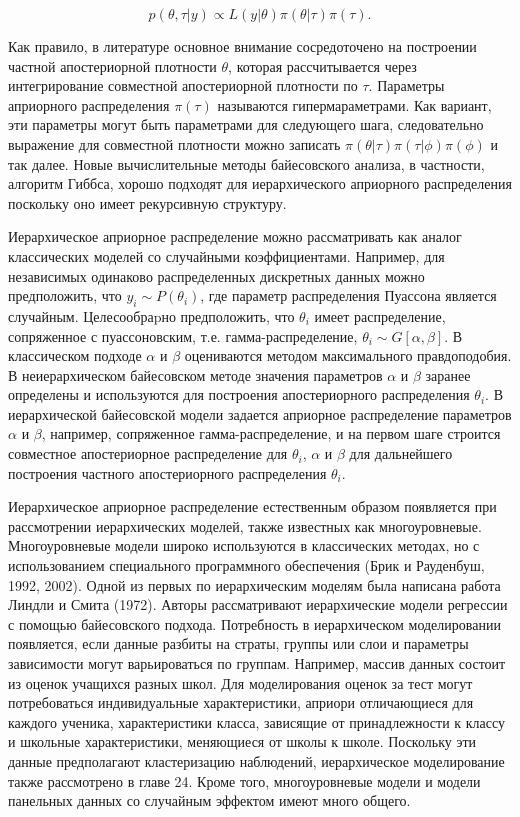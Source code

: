 \[
p(\theta,\tau|y){\propto}L(y|\theta)\pi(\theta|\tau)\pi(\tau).
\]

Как правило, в литературе основное внимание сосредоточено на построении частной апостериорной плотности $\theta$, которая рассчитывается через интегрирование совместной апостериорной плотности по $\tau$. Параметры априорного распределения $\pi(\tau)$ называются гипермараметрами. Как вариант, эти параметры могут быть параметрами для следующего шага, следовательно выражение для совместной плотности можно записать $\pi(\theta|\tau)\pi(\tau|\phi)\pi(\phi)$ и так далее. Новые вычислительные методы байесовского анализа, в частности, алгоритм Гиббса, хорошо подходят для  иерархического априорного распределения поскольку оно имеет рекурсивную структуру.

Иерархическое априорное распределение можно рассматривать как аналог классических моделей со случайными коэффициентами. Например, для независимых одинаково распределенных дискретных данных можно предположить, что $y_i{\sim}P(\theta_i)$, где параметр распределения Пуассона является случайным. Целесообраpно предположить, что $\theta_i$ имеет распределение, сопряженное с пуассоновским, т.е. гамма-распределение, $\theta_i{\sim}G[\alpha,\beta]$. В классическом подходе $\alpha$ и $\beta$ оцениваются методом максимального правдоподобия. В неиерархическом байесовском методе значения параметров $\alpha$ и $\beta$ заранее определены и используются для построения апостериорного распределения $\theta_i$. В иерархической байесовской модели задается априорное распределение параметров $\alpha$ и $\beta$, например, сопряженное гамма-распределение, и на первом шаге строится совместное апостериорное распределение для $\theta_i$, $\alpha$ и $\beta$ для дальнейшего построения частного апостериорного распределения $\theta_i$.

Иерархическое априорное распределение естественным образом появляется при рассмотрении иерархических моделей, также известных как многоуровневые. Многоуровневые модели широко используются в классических методах, но с использованием специального программного обеспечения (Брик и Рауденбуш, 1992, 2002). Одной из первых по иерархическим моделям была написана работа Линдли и Смита (1972). Авторы рассматривают иерархические модели регрессии с помощью байесовского подхода. Потребность в иерархическом моделировании появляется, если данные разбиты на страты, группы или слои и параметры зависимости могут варьироваться по группам. Например, массив данных состоит из оценок учащихся разных школ. Для моделирования оценок за тест могут потребоваться индивидуальные характеристики, априори отличающиеся для каждого ученика, характеристики класса, зависящие от принадлежности к классу и школьные характеристики, меняющиеся от школы к школе. Поскольку эти данные предполагают кластеризацию наблюдений, иерархическое моделирование также рассмотрено в главе 24. Кроме того, многоуровневые модели и модели панельных данных со случайным эффектом имеют много общего.


